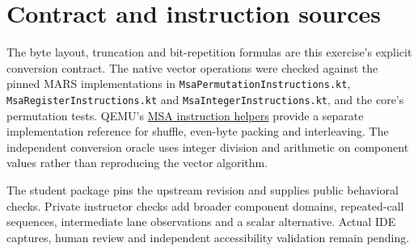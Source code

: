 \section*{Contract and instruction sources}
The byte layout, truncation and bit-repetition formulas are this exercise's explicit
conversion contract. The native vector operations were checked against the pinned
MARS implementations in \texttt{MsaPermutationInstructions.kt},
\texttt{MsaRegisterInstructions.kt} and \texttt{MsaIntegerInstructions.kt}, and the
core's permutation tests. QEMU's
\href{https://github.com/qemu/qemu/blob/1f7fe57fce1ea3902db5c99ea1cb1db97c98e9a0/target/mips/tcg/msa_helper.c}{MSA instruction helpers}
provide a separate implementation reference for shuffle, even-byte packing and
interleaving. The independent conversion oracle uses integer division and arithmetic
on component values rather than reproducing the vector algorithm.

The student package pins the upstream revision and supplies public behavioral checks.
Private instructor checks add broader component domains, repeated-call sequences,
intermediate lane observations and a scalar alternative. Actual IDE captures,
human review and independent accessibility validation remain pending.
